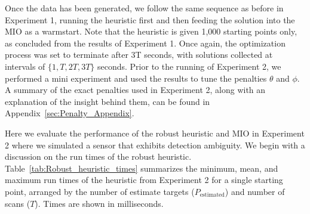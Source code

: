 \documentclass[journal]{IEEEtran}
\begin{document}
Once the data has been generated, we follow the same sequence as before in Experiment 1, running the heuristic first and then feeding the solution into the MIO as a warmstart. Note that the heuristic is given 1,000 starting points only, as concluded from the results of Experiment 1. Once again, the optimization process was set to terminate after 3T seconds, with solutions collected at intervals of $\{1,T,2T,3T\}$ seconds. Prior to the running of Experiment 2, we performed a mini experiment and used the results to tune the penalties $\theta$ and $\phi$. A summary of the exact penalties used in Experiment 2, along with an explanation of the insight behind them, can be found in Appendix~\ref{sec:Penalty_Appendix}. 

Here we evaluate the performance of the robust heuristic and MIO in Experiment 2 where we simulated a sensor that exhibits detection ambiguity. We begin with a discussion on the run times of the robust heuristic. Table~\ref{tab:Robust_heuristic_times} summarizes the minimum, mean, and maximum run times of the heuristic from Experiment 2 for a single starting point, arranged by the number of estimate targets ($P_{\text{estimated}}$) and number of scans ($T$). Times are shown in milliseconds. 
\end{document}
